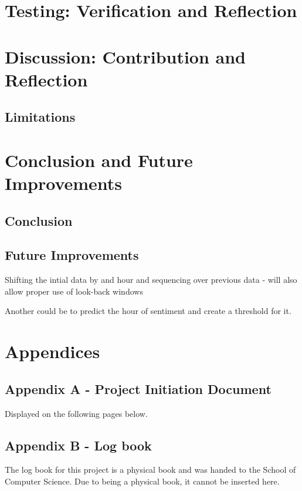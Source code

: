 \documentclass[oneside, 10pt]{article}
\begin{document}
	\section{Testing: Verification and Reflection}
	
	\newpage
	
	\section{Discussion: Contribution and Reflection}
	\subsection{Limitations}
	
	
	\newpage
	
	\section{Conclusion and Future Improvements}
		\subsection{Conclusion}
		\subsection{Future Improvements}
		Shifting the intial data by and hour and sequencing over previous data - will also allow proper use of look-back windows
		
		Another could be to predict the hour of sentiment and create a threshold for it.
		
	\newpage
	
	\nocite{*}
	\printbibliography
	
	\newpage
	\section{Appendices}
		\subsection{Appendix A - Project Initiation Document}
		Displayed on the following pages below.
		
		\subsection{Appendix B - Log book}
		The log book for this project is a physical book and was handed to the School of Computer Science. Due to being a physical book, it cannot be inserted here.
	
\end{document}

